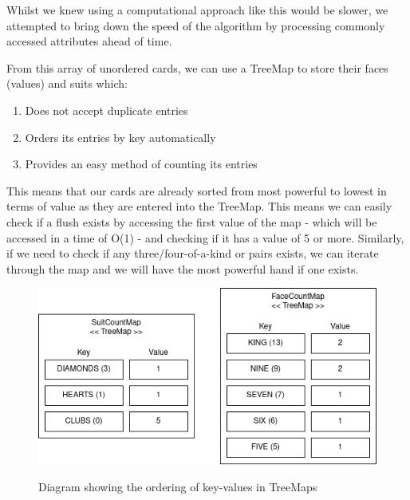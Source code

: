 \documentclass[11pt]{article}
\begin{document}
Whilst we knew using a computational approach like this would be slower, we attempted to bring down the speed of the algorithm by processing commonly accessed attributes ahead of time.\\

\setlength{\fboxrule}{0pt}
\noindent{}%

\vspace{8pt}
From this array of unordered cards, we can use a TreeMap to store their faces (values) and suits which: 
\begin{enumerate}
	\item Does not accept duplicate entries
	\item Orders its entries by key automatically
	\item Provides an easy method of counting its entries
\end{enumerate}

\vspace{8pt}

This means that our cards are already sorted from most powerful to lowest in terms of value as they are entered into the TreeMap. This means we can easily check if a flush exists by accessing the first value of the map - which will be accessed in a time of O(1) - and checking if it has a value of 5 or more. Similarly, if we need to check if any three/four-of-a-kind or pairs exists, we can iterate through the map and we will have the most powerful hand if one exists. 

\begin{figure}[h]
\begin{center}
\includegraphics[scale=0.6]{treemaps} \\
\caption{Diagram showing the ordering of key-values in TreeMaps}
\end{center}
\end{figure}
\end{document}
